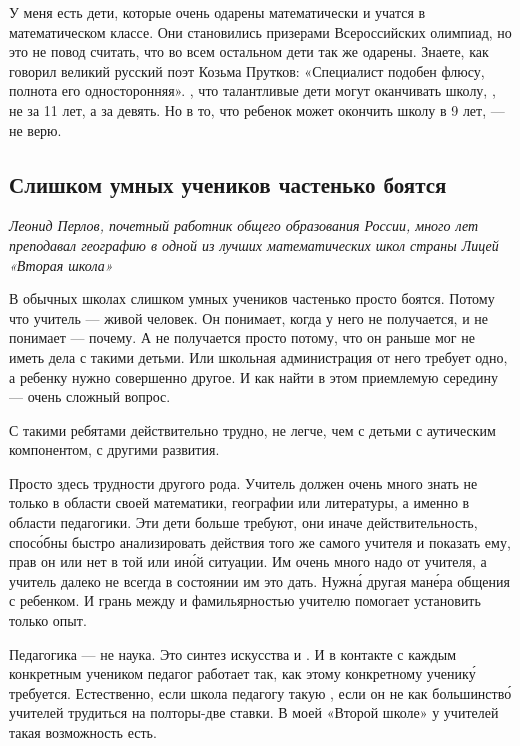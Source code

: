 У меня есть дети, которые очень одарены математически и учатся в математическом классе. Они становились призерами Всероссийских олимпиад, но это не повод считать, что во всем остальном дети так же одарены. Знаете, как говорил великий русский поэт Козьма Прутков: «Специалист подобен флюсу, полнота его односторонняя». , что талантливые дети могут оканчивать школу, , не за 11 лет, а за девять. Но в то, что ребенок может окончить школу в 9 лет, --- не верю.

\subsection{Слишком умных учеников частенько боятся}
\textit{Леонид Перлов, почетный работник общего образования России, много лет преподавал географию в одной из лучших математических школ страны Лицей «Вторая школа»}

В обычных школах слишком умных учеников частенько просто боятся. Потому что учитель --- живой человек. Он понимает, когда у него не получается, и не понимает --- почему. А не получается просто потому, что он раньше мог не иметь дела с такими детьми. Или школьная администрация от него требует одно, а ребенку нужно совершенно другое. И как найти в этом приемлемую середину --- очень сложный вопрос.

С такими ребятами действительно трудно,  не легче, чем с детьми с аутическим компонентом, с другими  развития.

Просто здесь трудности другого рода. Учитель должен очень много знать не только в области своей математики, географии или литературы, а именно в области педагогики. Эти дети больше требуют, они иначе  действительность, спос\'{о}бны быстро анализировать действия того же самого учителя и показать ему, прав он или нет в той или ин\'{о}й ситуации. Им очень много надо от учителя, а учитель далеко не всегда в состоянии им это дать. Нужн\'{а} другая ман\'{е}ра общения с ребенком. И грань между  и фамильярностью учителю помогает установить только опыт.

Педагогика --- не наука. Это синтез искусства и . И в контакте с каждым конкретным учеником педагог работает так, как этому конкретному ученик\'{у} требуется. Естественно, если школа  педагогу такую , если он не  как большинств\'{о} учителей трудиться на полторы-две ставки. В моей «Второй школе» у учителей такая возможность есть.

